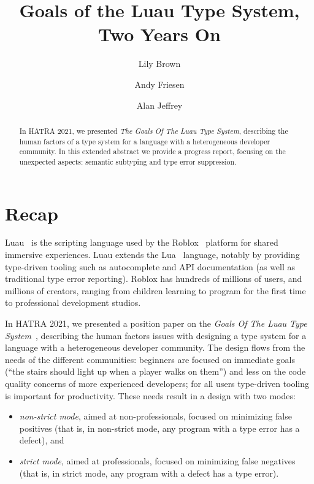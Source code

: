 \documentclass[acmsmall]{acmart}
\begin{document}
\title{Goals of the Luau Type System, Two Years On}

\author{Lily Brown}
\author{Andy Friesen}
\author{Alan Jeffrey}

\begin{abstract}
In HATRA 2021, we presented \emph{The Goals Of The Luau Type System},
describing the human factors of a type system for a
language with a heterogeneous developer community. In this extended
abstract we provide a progress report, focusing on
the unexpected aspects: semantic subtyping and type error
suppression.
\end{abstract}

\maketitle

\section{Recap}

Luau~\cite{Luau} is the scripting language used by the
Roblox~\cite{Roblox} platform for shared immersive experiences.  Luau extends
the Lua~\cite{Lua} language, notably by providing type-driven tooling
such as autocomplete and API documentation (as well as traditional type
error reporting). Roblox has hundreds of millions of users, and
millions of creators, ranging from children learning to program for
the first time to professional development studios.

In HATRA 2021, we presented a position paper on the \emph{Goals Of The Luau Type
System}~\cite{BFJ21:GoalsLuau}, describing the human factors issues
with designing a type system for a language with a heterogeneous
developer community. The design flows from the needs of the different
communities: beginners are focused on immediate goals (``the stairs
should light up when a player walks on them'') and less on the code
quality concerns of more experienced developers; for all users
type-driven tooling is important for productivity. These needs result in a design with two modes:
\begin{itemize}
\item \emph{non-strict mode}, aimed at non-professionals, focused on
  minimizing false positives (that is, in non-strict mode, any program with a type error has a defect), and
\item \emph{strict mode}, aimed at professionals, focused on
  minimizing false negatives (that is, in strict mode, any program with a defect has a type error).
\end{itemize}
\end{document}
